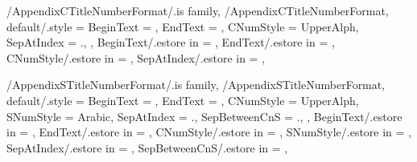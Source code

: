 
\pgfkeys
{
  /AppendixCTitleNumberFormat/.is family, /AppendixCTitleNumberFormat,
  default/.style =
  {
    BeginText = \empty,
    EndText = \empty,
    CNumStyle = UpperAlph,
    SepAtIndex = {.},
  },
  BeginText/.estore in = \GetAppendixCTitleNumberFormatBeginText,
  EndText/.estore in = \GetAppendixCTitleNumberFormatEndText,
  CNumStyle/.estore in = \GetAppendixCTitleNumberFormatCNumStyle,
  SepAtIndex/.estore in = \GetAppendixCTitleNumberFormatSepAtIndex,
} %

\newcommand\GetAppendixChapterTitleNumberFormatString{}
\newcommand\SetupAppendixChapterTitleNumberFormatString
{%
  \SetupTitleNumberFormatString{Chapter}%
  {%
    BeginText=\GetAppendixCTitleNumberFormatBeginText,%
    EndText=\GetAppendixCTitleNumberFormatEndText,%
    CNumStyle=\GetAppendixCTitleNumberFormatCNumStyle,%
    CCounterName=appendixchapter,%
  }{\GetAppendixChapterTitleNumberFormatString}%
} %


\pgfkeys
{
  /AppendixSTitleNumberFormat/.is family, /AppendixSTitleNumberFormat,
  default/.style =
  {
    BeginText = \empty,
    EndText = \empty,
    CNumStyle = UpperAlph,
    SNumStyle = Arabic,
    SepAtIndex = {.}, %
    SepBetweenCnS = {.}, %
  },
  BeginText/.estore in = \GetAppendixSTitleNumberFormatBeginText,
  EndText/.estore in = \GetAppendixSTitleNumberFormatEndText,
  CNumStyle/.estore in = \GetAppendixSTitleNumberFormatCNumStyle,
  SNumStyle/.estore in = \GetAppendixSTitleNumberFormatSNumStyle,
  SepAtIndex/.estore in = \GetAppendixSTitleNumberFormatSepAtIndex,
  SepBetweenCnS/.estore in = \GetAppendixSTitleNumberFormatSepBetweenCnS,
} %

\newcommand\GetAppendixSectionTitleNumberFormatString{}
\newcommand\SetupAppendixSectionTitleNumberFormatString
{%
  \SetupTitleNumberFormatString{AppendixSection}%
  {%
    BeginText=\GetAppendixSTitleNumberFormatBeginText,%
    EndText=\GetAppendixSTitleNumberFormatEndText,%
    CNumStyle=\GetAppendixSTitleNumberFormatCNumStyle,%
    SNumStyle=\GetAppendixSTitleNumberFormatSNumStyle,%
    SepAtIndex=\GetAppendixSTitleNumberFormatSepAtIndex,%
    SepBetweenCnS=\GetAppendixSTitleNumberFormatSepBetweenCnS,%
    CCounterName=appendixchapter,%
    SCounterName=appendixsection,%
  }{\GetAppendixSectionTitleNumberFormatString}%
} %

